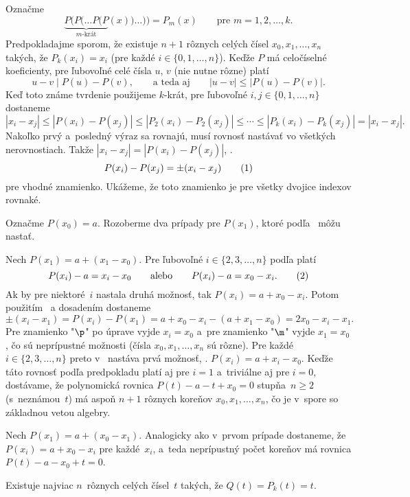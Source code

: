 {%
%
Označme
$$
\underbrace{P(P(\dots P(P}_{\text{$m$-krát}}(x))\dots))=P_m(x)\qquad\text{pre $m=1,2,\dots,k$.}
$$
Predpokladajme sporom, že existuje $n+1$ rôznych celých čísel $x_0,x_1,\dots,x_n$ takých, že $P_k(x_i)=x_i$ (pre každé $i\in\{0,1,\dots,n\}$). Keďže $P$ má celočíselné koeficienty, pre ľubovoľné celé čísla $u$, $v$ (nie nutne rôzne) platí
$$
u-v \mid P(u)-P(v),\qquad\text{a teda aj}\qquad |u-v|\le|P(u)-P(v)|.
$$
Keď toto známe tvrdenie použijeme $k$-krát, pre ľubovoľné $i,j\in\{0,1,\dots,n\}$ dostaneme
$$
|x_i-x_j|\le|P(x_i)-P(x_j)|\le|P_2(x_i)-P_2(x_j)|\le\cdots\le|P_k(x_i)-P_k(x_j)|=|x_i-x_j|.
$$
Nakoľko prvý a~posledný výraz sa rovnajú, musí rovnosť nastávať vo všetkých nerovnostiach. Takže $|x_i-x_j|=|P(x_i)-P(x_j)|$, \tj.
$$
P(x_i)-P(x_j)=\pm(x_i-x_j)
\tag1
$$
pre vhodné znamienko. Ukážeme, že toto znamienko je pre všetky dvojice indexov rovnaké.

Označme $P(x_0)=a$. Rozoberme dva prípady pre $P(x_1)$, ktoré podľa~ môžu nastať.

Nech $P(x_1)=a+(x_1-x_0)$. Pre ľubovoľné $i\in\{2,3,\dots,n\}$ podľa  platí
$$
P(x_i)-a=x_i-x_0\qquad\text{alebo}\qquad P(x_i)-a=x_0-x_i.
\tag2
$$
Ak by pre niektoré~$i$ nastala druhá možnosť, tak $P(x_i)=a+x_0-x_i$.
Potom použitím~ a dosadením dostaneme
$$
\pm(x_i-x_1)=P(x_i)-P(x_1)=a+x_0-x_i-(a+x_1-x_0)=2x_0-x_i-x_1.
$$
Pre znamienko "$\p$" po úprave vyjde $x_i=x_0$ a~pre znamienko "$\m$" vyjde $x_1=x_0$, čo sú neprípustné možnosti (čísla $x_0,x_1,\dots,x_n$ sú rôzne). Pre každé $i\in\{2,3,\dots,n\}$ preto v~ nastáva prvá možnosť, \tj. $P(x_i)=a+x_i-x_0$. Keďže táto rovnosť podľa predpokladu platí aj pre $i=1$ a~triviálne aj pre $i=0$, dostávame, že polynomická rovnica $P(t)-a-t+x_0=0$ stupňa~$n\ge2$ (s~neznámou~$t$) má aspoň $n+1$ rôznych koreňov $x_0,x_1,\dots,x_n$, čo je v~spore so základnou vetou algebry.

Nech $P(x_1)=a+(x_0-x_1)$. Analogicky ako v~prvom prípade dostaneme, že $P(x_i)=a+x_0-x_i$ pre každé~$x_i$, a~teda  neprípustný počet koreňov má rovnica $P(t)-a-x_0+t=0$.

\zaver
Existuje najviac $n$~rôznych celých čísel~$t$ takých, že $Q(t)=P_k(t)=t$. 
}

